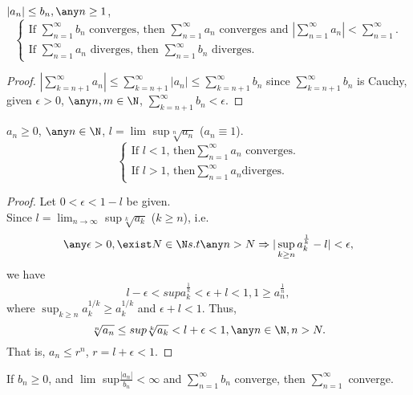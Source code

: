 \begin{theorem}
\label{Comparison Test}
     $|a_n| \leq b_n, \any n \geq 1$, 
 \[
 \begin{cases}
        \text{If $\sum_{n=1}^\infty b_n$ converges, then $\sum_{n=1}^\infty a_n$ converges and $\left|\sum_{n=1}^\infty a_n \right| < \sum_{n=1}^\infty$}. \\
        \text {If $\sum_{n=1}^\infty a_n$ diverges, then $\sum_{n=1}^\infty b_n$ diverges.}
    \end{cases}
\]    
\end{theorem}
\begin{proof}
    $\left|\sum_{k=n+1}^\infty a_n \right| \leq \sum_{k=n+1}^\infty |a_n| \leq \sum_{k=n+1}^\infty b_n$ since $\sum_{k=n+1}^\infty b_n$ is Cauchy, given $\epsilon > 0$, $\any n,m \in \N$, $\sum_{k=n+1}^\infty b_n <\epsilon$.
\end{proof}

\begin{theorem}
\label{Root Test}
    $a_n \geq 0$, $\any n \in \N$, $l = \lim$  sup$\sqrt[n]{a_n}$ ($a_n \equiv 1$).
\[    
    \begin{cases}
        \text{If } l <1 \text{, then} \sum_{n=1}^\infty a_n \text{ converges.} \\
        \text{If } l > 1 \text{, then} \sum_{n=1}^\infty a_n \text{diverges.}
    \end{cases}
\]
\end{theorem}
\begin{proof}
    Let $0<\epsilon<1-l$ be given. \\
    Since $l=\lim_{n\to\infty}$ sup$\sqrt[k]{a_k}$ ($k \geq n$), i.e. 
    \[
    \any \epsilon > 0, \exist N \in \N s.t \any n > N \Rightarrow |\sup_{k\geq n} a^{\frac{1}{k}}_k - l| < \epsilon,
    \]
    we have
    \[
    l-\epsilon < sup a_k^\frac{1}{k} < \epsilon + l < 1 , 1\geq a_n^\frac{1}{n},
    \]
    where $\sup_{k\geq n} a_k^{1/k} \geq a_k^{1/k}$ and $\epsilon + l < 1$. Thus,
    \[
    \sqrt[n]{a_n} \leq sup\sqrt[k]{a_k} < l + \epsilon <1, \any n \in \N, n >N.
    \]
    That is, $a_n \leq r^n$, $r=l + \epsilon < 1$.
\end{proof}

\begin{theorem}
\label{Limit Comparison Test}
    If $b_n \geq 0$,  and $\lim$ sup$\frac{|a_n|}{b_n} < \infty$ and $\sum_{n=1}^\infty b_n$ converge, then $\sum_{n=1}^\infty$ converge.
\end{theorem}

